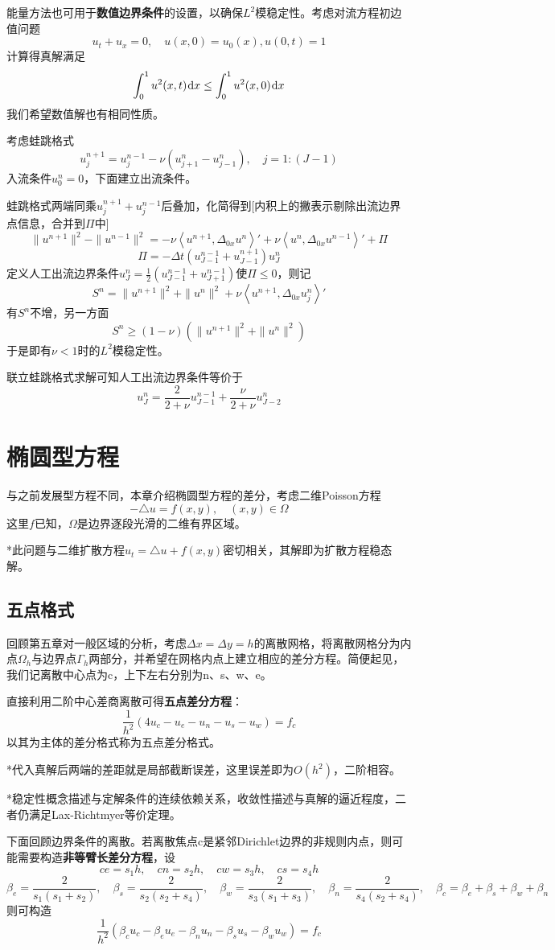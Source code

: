 \documentclass[a4paper,UTF8,fontset=windows]{ctexart}
\newcommand*{\dr}{\hspace{0.07em}\mathrm{d}}
\begin{document}
能量方法也可用于\textbf{数值边界条件}的设置，以确保$L^2$模稳定性。考虑对流方程初边值问题
$$u_t+u_x=0,\quad u(x,0)=u_0(x),u(0,t)=1$$
计算得真解满足
$$\int_0^1u^2(x,t)\dr x\le\int_0^1u^2(x,0)\dr x$$
我们希望数值解也有相同性质。

考虑蛙跳格式
$$u_j^{n+1}=u_j^{n-1}-\nu(u_{j+1}^n-u_{j-1}^n),\quad j=1:(J-1)$$
入流条件$u_0^n=0$，下面建立出流条件。

蛙跳格式两端同乘$u_j^{n+1}+u_j^{n-1}$后叠加，化简得到[内积上的撇表示剔除出流边界点信息，合并到$\Pi$中]
$$\|u^{n+1}\|^2-\|u^{n-1}\|^2=-\nu\left<u^{n+1},\Delta_{0x}u^n\right>'+\nu\left<u^n,\Delta_{0x}u^{n-1}\right>'+\Pi$$
$$\Pi=-\Delta t(u_{J-1}^{n-1}+u_{J-1}^{n+1})u_J^n$$
定义人工出流边界条件$u_J^n=\frac{1}{2}(u_{J-1}^{n-1}+u_{J+1}^{n-1})$使$\Pi\le0$，则记
$$S^n=\|u^{n+1}\|^2+\|u^n\|^2+\nu\left<u^{n+1},\Delta_{0x}u_j^n\right>'$$
有$S^n$不增，另一方面
$$S^n\ge(1-\nu)(\|u^{n+1}\|^2+\|u^n\|^2)$$
于是即有$\nu<1$时的$L^2$模稳定性。

联立蛙跳格式求解可知人工出流边界条件等价于
$$u_J^n=\frac{2}{2+\nu}u_{J-1}^{n-1}+\frac{\nu}{2+\nu}u_{J-2}^n$$

\section{椭圆型方程}
与之前发展型方程不同，本章介绍椭圆型方程的差分，考虑二维Poisson方程
$$-\triangle u=f(x,y),\quad(x,y)\in\Omega$$
这里$f$已知，$\Omega$是边界逐段光滑的二维有界区域。

*此问题与二维扩散方程$u_t=\triangle u+f(x,y)$密切相关，其解即为扩散方程稳态解。

\subsection{五点格式}
回顾第五章对一般区域的分析，考虑$\Delta x=\Delta y=h$的离散网格，将离散网格分为内点$\Omega_h$与边界点$\Gamma_h$两部分，并希望在网格内点上建立相应的差分方程。简便起见，我们记离散中心点为c，上下左右分别为n、s、w、e。

直接利用二阶中心差商离散可得\textbf{五点差分方程}：
$$\frac{1}{h^2}(4u_c-u_e-u_n-u_s-u_w)=f_c$$
以其为主体的差分格式称为五点差分格式。

*代入真解后两端的差距就是局部截断误差，这里误差即为$O(h^2)$，二阶相容。

*稳定性概念描述与定解条件的连续依赖关系，收敛性描述与真解的逼近程度，二者仍满足Lax-Richtmyer等价定理。

下面回顾边界条件的离散。若离散焦点c是紧邻Dirichlet边界的非规则内点，则可能需要构造\textbf{非等臂长差分方程}，设
$$ce=s_1h,\quad cn=s_2h,\quad cw=s_3h,\quad cs=s_4h$$
$$\beta_e=\frac{2}{s_1(s_1+s_2)},\quad\beta_s=\frac{2}{s_2(s_2+s_4)},\quad\beta_w=\frac{2}{s_3(s_1+s_3)},\quad\beta_n=\frac{2}{s_4(s_2+s_4)},\quad \beta_c=\beta_e+\beta_s+\beta_w+\beta_n$$
则可构造
$$\frac{1}{h^2}(\beta_cu_c-\beta_eu_e-\beta_nu_n-\beta_su_s-\beta_wu_w)=f_c$$
\end{document}
